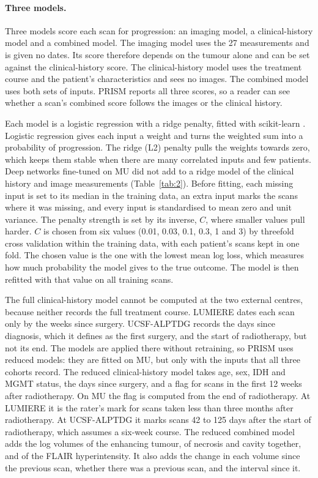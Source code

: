 \paragraph*{Three models.} Three models score each scan for progression: an imaging model, a clinical-history model
and a combined model. The imaging model uses the 27 measurements and is given no dates. Its score therefore depends on
the tumour alone and can be set against the clinical-history score. The clinical-history model uses the treatment
course and the patient's characteristics and sees no images. The combined model uses both sets of inputs. PRISM
reports all three scores, so a reader can see whether a scan's combined score follows the images or the clinical
history.

Each model is a logistic regression with a ridge penalty, fitted with scikit-learn \citep{pedregosa2011}. Logistic
regression gives each input a weight and turns the weighted sum into a probability of progression. The ridge (L2)
penalty pulls the weights towards zero, which keeps them stable when there are many correlated inputs and few
patients. Deep networks fine-tuned on MU did not add to a ridge model of the clinical history and image measurements
(Table~\ref{tab:2}). Before fitting, each missing input is set to its median in the training data, an extra input
marks the scans where it was missing, and every input is standardised to mean zero and unit variance. The penalty
strength is set by its inverse, $C$, where smaller values pull harder. $C$ is chosen from six values (0.01, 0.03, 0.1,
0.3, 1 and 3) by threefold cross validation within the training data, with each patient's scans kept in one fold.
The chosen value is the one with the lowest mean log loss, which measures how much probability the model gives to the
true outcome. The model is then refitted with that value on all training scans.

The full clinical-history model cannot be computed at the two external centres, because neither records the full
treatment course. LUMIERE dates each scan only by the weeks since surgery. UCSF-ALPTDG records the days since
diagnosis, which it defines as the first surgery, and the start of radiotherapy, but not its end. The models are
applied there without retraining, so PRISM uses reduced models: they are fitted on MU, but only with the inputs that
all three cohorts record. The reduced clinical-history model takes age, sex, IDH and MGMT status, the days since
surgery, and a flag for scans in the first 12 weeks after radiotherapy. On MU the flag is computed from the end of
radiotherapy. At LUMIERE it is the rater's mark for scans taken less than three months after radiotherapy. At
UCSF-ALPTDG it marks scans 42 to 125 days after the start of radiotherapy, which assumes a six-week course. The
reduced combined model adds the log volumes of the enhancing tumour, of necrosis and cavity together, and of the FLAIR
hyperintensity. It also adds the change in each volume since the previous scan, whether there was a previous scan, and
the interval since it.

